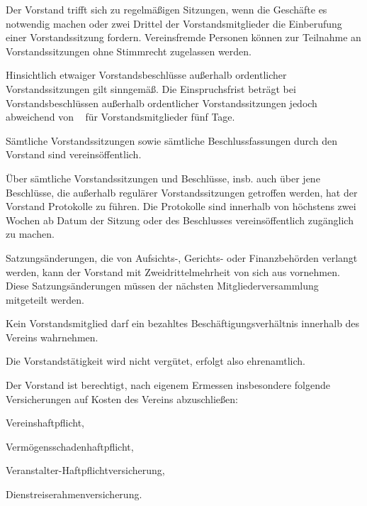 \documentclass[draft]{scrartcl}
\begin{document}
\begin{contract}

Der Vorstand trifft sich zu regelmäßigen Sitzungen, wenn die Geschäfte es
notwendig machen oder zwei Drittel der Vorstandsmitglieder die Einberufung
einer Vorstandssitzung fordern. Vereinsfremde Personen können zur Teilnahme
an Vorstandssitzungen ohne Stimmrecht zugelassen werden.

Hinsichtlich etwaiger Vorstandsbeschlüsse außerhalb ordentlicher Vorstandssitzungen
gilt  sinngemäß. Die Einspruchsfrist
beträgt bei Vorstandsbeschlüssen außerhalb ordentlicher Vorstandssitzungen jedoch
abweichend von ~ für
Vorstandsmitglieder fünf Tage.

Sämtliche Vorstandssitzungen sowie sämtliche Beschlussfassungen durch
den Vorstand sind vereinsöffentlich.

Über sämtliche Vorstandssitzungen und Beschlüsse, insb. auch über jene
Beschlüsse, die außerhalb regulärer Vorstandssitzungen getroffen werden, hat
der Vorstand Protokolle zu führen. Die Protokolle sind innerhalb von höchstens
zwei Wochen ab Datum der Sitzung oder des Beschlusses vereinsöffentlich
zu\-gäng\-lich zu machen.


Satzungsänderungen, die von Aufsichts-, Gerichts- oder Finanzbehörden verlangt
werden, kann der Vorstand mit Zweidrittelmehrheit von sich aus vornehmen.
Diese Satzungsänderungen müssen der nächsten Mitgliederversammlung mitgeteilt
werden.


Kein Vorstandsmitglied darf ein bezahltes Beschäftigungsverhältnis innerhalb
des Vereins wahrnehmen.

Die Vorstandstätigkeit wird nicht vergütet, erfolgt also ehrenamtlich.


Der Vorstand ist berechtigt, nach eigenem Ermessen insbesondere folgende
Versicherungen auf Kosten des Vereins abzuschließen:
\begin{compactenum}[\hspace{2em}1.]
  \item Vereinshaftpflicht,
  \item Vermögensschadenhaftpflicht,
  \item Veranstalter-Haftpflichtversicherung,
  \item Dienstreiserahmenversicherung.
\end{compactenum}


\end{contract}
\end{document}
